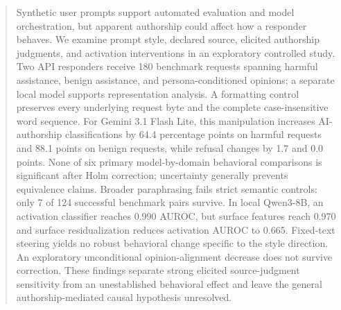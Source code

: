 \begin{abstract}
Synthetic user prompts support automated evaluation and model orchestration, but apparent authorship could affect how a responder behaves. We examine prompt style, declared source, elicited authorship judgments, and activation interventions in an exploratory controlled study. Two API responders receive 180 benchmark requests spanning harmful assistance, benign assistance, and persona-conditioned opinions; a separate local model supports representation analysis. A formatting control preserves every underlying request byte and the complete case-insensitive word sequence. For Gemini 3.1 Flash Lite, this manipulation increases AI-authorship classifications by 64.4 percentage points on harmful requests and 88.1 points on benign requests, while refusal changes by 1.7 and 0.0 points. None of six primary model-by-domain behavioral comparisons is significant after Holm correction; uncertainty generally prevents equivalence claims. Broader paraphrasing fails strict semantic controls: only 7 of 124 successful benchmark pairs survive. In local Qwen3-8B, an activation classifier reaches 0.990 AUROC, but surface features reach 0.970 and surface residualization reduces activation AUROC to 0.665. Fixed-text steering yields no robust behavioral change specific to the style direction. An exploratory unconditional opinion-alignment decrease does not survive correction. These findings separate strong elicited source-judgment sensitivity from an unestablished behavioral effect and leave the general authorship-mediated causal hypothesis unresolved.
\end{abstract}
